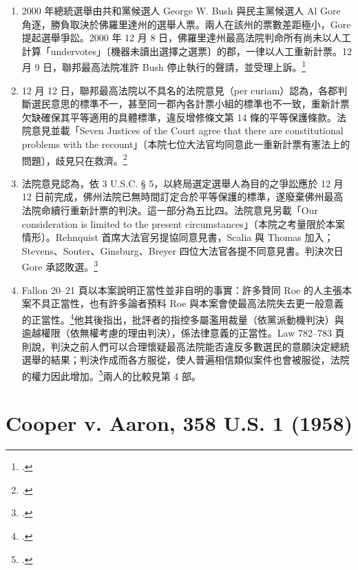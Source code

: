 \begin{enumerate}
\tightlist
\item
  2000 年總統選舉由共和黨候選人 George W. Bush 與民主黨候選人 Al Gore 角逐，勝負取決於佛羅里達州的選舉人票。兩人在該州的票數差距極小，Gore 提起選舉爭訟。2000 年 12 月 8 日，佛羅里達州最高法院判命所有尚未以人工計算「undervotes」〔機器未讀出選擇之選票〕的郡，一律以人工重新計票。12 月 9 日，聯邦最高法院准許 Bush 停止執行的聲請，並受理上訴。\footcite{bushvgore2000}
\item
  12 月 12 日，聯邦最高法院以不具名的法院意見（per curiam）認為，各郡判斷選民意思的標準不一，甚至同一郡內各計票小組的標準也不一致，重新計票欠缺確保其平等適用的具體標準，違反增修條文第 14 條的平等保護條款。法院意見並載「Seven Justices of the Court agree that there are constitutional problems with the recount」〔本院七位大法官均同意此一重新計票有憲法上的問題〕，歧見只在救濟。\footcite{bushvgore2000}
\item
  法院意見認為，依 3 U.S.C. § 5，以終局選定選舉人為目的之爭訟應於 12 月 12 日前完成，佛州法院已無時間訂定合於平等保護的標準，遂廢棄佛州最高法院命續行重新計票的判決。這一部分為五比四。法院意見另載「Our consideration is limited to the present circumstances」〔本院之考量限於本案情形〕。Rehnquist 首席大法官另提協同意見書，Scalia 與 Thomas 加入；Stevens、Souter、Ginsburg、Breyer 四位大法官各提不同意見書。判決次日 Gore 承認敗選。\footcite{bushvgore2000}
\item
  Fallon 20--21 頁以本案說明正當性並非自明的事實：許多贊同 Roe 的人主張本案不具正當性，也有許多論者預料 Roe 與本案會使最高法院失去更一般意義的正當性。\footcite[20--21]{fallon2018}他其後指出，批評者的指控多屬濫用裁量（依黨派動機判決）與逾越權限（依無權考慮的理由判決），係法律意義的正當性。Law 782--783 頁則說，判決之前人們可以合理懷疑最高法院能否違反多數選民的意願決定總統選舉的結果；判決作成而各方服從，使人普遍相信類似案件也會被服從，法院的權力因此增加。\footcite[782--783]{law2009}兩人的比較見第 4 部。
\end{enumerate}

\section{Cooper v. Aaron, 358 U.S. 1 (1958)}
\label{sec:80_cases-cooper}

